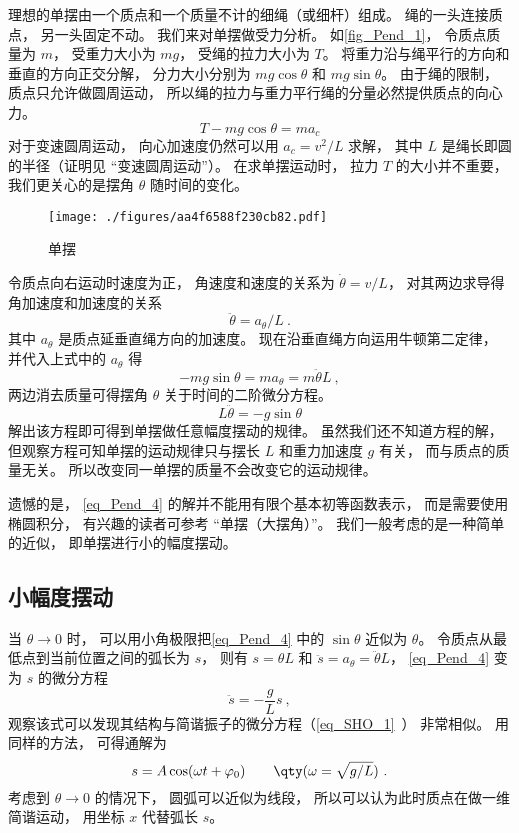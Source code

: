 

理想的单摆由一个质点和一个质量不计的细绳（或细杆）组成。 绳的一头连接质点， 另一头固定不动。 我们来对单摆做受力分析。 如\autoref{fig_Pend_1}， 令质点质量为 $m$， 受重力大小为 $mg$， 受绳的拉力大小为 $T$。 将重力沿与绳平行的方向和垂直的方向正交分解， 分力大小分别为 $mg\cos\theta$ 和 $mg\sin\theta$。 由于绳的限制， 质点只允许做圆周运动， 所以绳的拉力与重力平行绳的分量必然提供质点的向心力。
\begin{equation}
T - mg\cos\theta = ma_c
\end{equation}
对于变速圆周运动， 向心加速度仍然可以用 $a_c = v^2/L$ 求解， 其中 $L$ 是绳长即圆的半径（证明见 “变速圆周运动”）。%
在求单摆运动时， 拉力 $T$ 的大小并不重要， 我们更关心的是摆角 $\theta$ 随时间的变化。
\begin{figure}[ht]
\centering
\texttt{[image: ./figures/aa4f6588f230cb82.pdf]}
\caption{单摆} \label{fig_Pend_1}
\end{figure}

令质点向右运动时速度为正， 角速度和速度的关系为 $\dot\theta = v/L$， 对其两边求导得角加速度和加速度的关系
\begin{equation}
\ddot\theta = a_\theta/L~.
\end{equation}
其中 $a_\theta$ 是质点延垂直绳方向的加速度。 现在沿垂直绳方向运用牛顿第二定律， 并代入上式中的 $a_\theta$ 得
\begin{equation}
-mg\sin\theta = ma_\theta = m\ddot\theta L~,
\end{equation}
两边消去质量可得摆角 $\theta$ 关于时间的二阶微分方程。
\begin{equation}\label{eq_Pend_4}
L\ddot\theta = - g\sin\theta
\end{equation}
解出该方程即可得到单摆做任意幅度摆动的规律。 虽然我们还不知道方程的解， 但观察方程可知单摆的运动规律只与摆长 $L$ 和重力加速度 $g$ 有关， 而与质点的质量无关。 所以改变同一单摆的质量不会改变它的运动规律。

遗憾的是， \autoref{eq_Pend_4} 的解并不能用有限个基本初等函数表示， 而是需要使用椭圆积分， 有兴趣的读者可参考 “单摆（大摆角）”。 我们一般考虑的是一种简单的近似， 即单摆进行小的幅度摆动。

\subsection{小幅度摆动}
当 $\theta \to 0$ 时， 可以用小角极限把\autoref{eq_Pend_4} 中的 $\sin\theta$ 近似为 $\theta$。 令质点从最低点到当前位置之间的弧长为 $s$， 则有 $s = \theta L$ 和 $\ddot s = a_\theta = \ddot\theta L$， \autoref{eq_Pend_4} 变为 $s$ 的微分方程
\begin{equation}
\ddot s = - \frac gL s~,
\end{equation}
观察该式可以发现其结构与简谐振子的微分方程（\autoref{eq_SHO_1}~） 非常相似。 用同样的方法， 可得通解为
\begin{equation}
s = A\cos(\omega t + \varphi_0)  \qquad \qty(\omega  = \sqrt{g/L})~.
\end{equation}
考虑到 $\theta \to 0$ 的情况下， 圆弧可以近似为线段， 所以可以认为此时质点在做一维简谐运动， 用坐标 $x$ 代替弧长 $s$。

